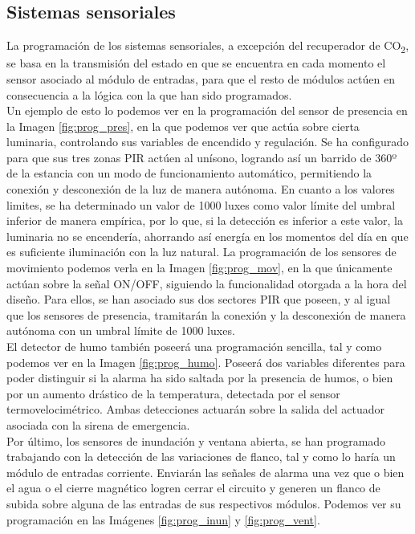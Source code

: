 \subsection{Sistemas sensoriales}La programación de los sistemas sensoriales, a excepción del recuperador de CO\textsubscript{2}, se basa en la transmisión del estado en que se encuentra en cada momento el sensor asociado al módulo de entradas, para que el resto de módulos actúen en consecuencia a la lógica con la que han sido programados.\\
Un ejemplo de esto lo podemos ver en la programación del sensor de presencia en la Imagen \ref{fig:prog_pres}, en la que podemos ver que actúa sobre cierta luminaria, controlando sus variables de encendido y regulación. Se ha configurado para que sus tres zonas PIR actúen al unísono, logrando así un barrido de 360º de la estancia con un modo de funcionamiento automático, permitiendo la conexión y desconexión de la luz de manera autónoma. En cuanto a los valores  limites, se ha determinado un valor de 1000 luxes como valor límite del umbral inferior de manera empírica, por lo que, si la detección es inferior a este valor, la luminaria no se encendería, ahorrando así energía en los momentos del día en que es suficiente iluminación con la luz natural.
La programación de los sensores de movimiento podemos verla en la Imagen \ref{fig:prog_mov}, en la que únicamente actúan sobre la señal ON/OFF, siguiendo la funcionalidad otorgada a la hora del diseño. Para ellos, se han asociado sus dos sectores PIR que poseen, y al igual que los sensores de presencia, tramitarán la conexión y la desconexión de manera autónoma con un umbral límite de 1000 luxes.\\
El detector de humo también poseerá una programación sencilla, tal y como podemos ver en la Imagen \ref{fig:prog_humo}.  Poseerá dos variables diferentes para poder distinguir si la alarma ha sido saltada por la presencia de humos, o bien por un aumento drástico de la temperatura, detectada por el sensor termovelocimétrico. Ambas detecciones actuarán sobre la salida del actuador asociada con la sirena de emergencia.\\
Por último, los sensores de inundación y ventana abierta, se han programado trabajando con la detección de las variaciones de flanco, tal y como lo haría un módulo de entradas corriente. Enviarán las señales de alarma una vez que o bien el agua o el cierre magnético logren cerrar el circuito y generen un flanco de subida sobre alguna de las entradas de sus respectivos módulos. Podemos ver su programación en las Imágenes \ref{fig:prog_inun} y \ref{fig:prog_vent}.

